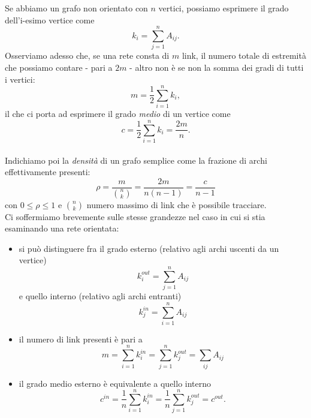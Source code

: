 Se abbiamo un grafo non orientato con $ n $ vertici, possiamo esprimere il grado dell'i-esimo vertice come
\begin{equation}
	k_i = \sum_{j=1}^n A_{ij}.
\end{equation}
Osserviamo adesso che, se una rete consta di $ m $ link, il numero totale di estremità che possiamo contare - pari a $ 2m $ - altro non è se non la somma dei gradi di tutti i vertici: 
\begin{equation}
	m = \frac{1}{2} \sum_{i=1}^n k_i,
\end{equation}
il che ci porta ad esprimere il grado \emph{medio} di un vertice come 
\begin{equation}
 	c = \frac{1}{2} \sum_{i=1}^n k_i = \frac{2m}{n}. 
\end{equation}
 \\Indichiamo poi la \emph{densità} di un grafo semplice come la frazione di archi effettivamente presenti:
\begin{equation}
	\rho = \frac{m}{\binom{n}{k}} = \frac{2m}{n\left(n-1 \right)} = \frac{c}{n-1}
\end{equation}
con $ 0 \leq \rho \leq  1 $ e  $ \binom{n}{k} $  numero massimo di link che è possibile tracciare. \\Ci soffermiamo brevemente sulle stesse grandezze nel caso in cui si stia esaminando una rete orientata:
\begin{itemize}
\item si può distinguere fra il grado esterno (relativo agli archi uscenti da un vertice)
	\begin{equation}
		k_{i}^{out} = \sum_{j=1}^n A_{ij}	
	\end{equation}
e quello interno (relativo agli archi entranti)
	\begin{equation}
		k_{j}^{in} = \sum_{i=1}^n A_{ij}
	\end{equation}
\item il numero di link presenti è pari a
	\begin{equation}
		m = \sum_{i=1}^n k_i^{in} = \sum_{j=1}^n k_j^{out} = \sum_{ij} A_{ij}
	\end{equation}
\item il grado medio esterno è equivalente a quello interno
	\begin{equation}
		c^{in} = \frac{1}{n} \sum_{i=1}^n k_i^{in} = \frac{1}{n} \sum_{j=1}^n k_j^{out} = c^{out}.
	\end{equation}
\end{itemize}


